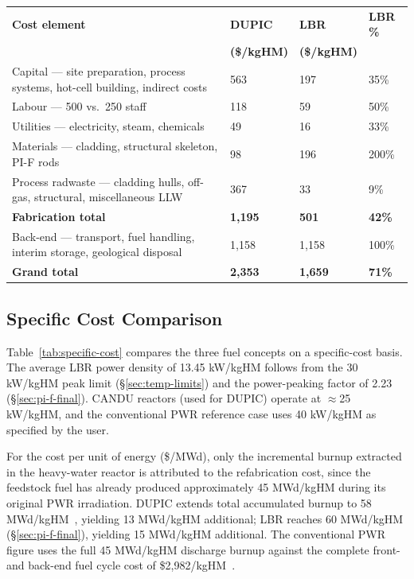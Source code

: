 \renewcommand{\arraystretch}{1.22}
\begin{tabularx}{\linewidth}{L{7.5cm} R{2.2cm} R{2.2cm} R{1.6cm}}
\toprule
\textbf{Cost element}
  & \textbf{DUPIC} & \textbf{LBR}
  & \textbf{LBR \%} \\
  & \textbf{(\$/kgHM)} & \textbf{(\$/kgHM)} & \\
\midrule
Capital --- site preparation, process systems,
  hot-cell building, indirect costs
  & 563 & 197 & 35\% \\
Labour --- 500 vs.\ 250 staff
  & 118 & 59  & 50\% \\
Utilities --- electricity, steam, chemicals
  & 49  & 16  & 33\% \\
Materials --- cladding, structural skeleton, PI-F rods
  & 98  & 196 & 200\% \\
Process radwaste --- cladding hulls, off-gas,
  structural, miscellaneous LLW
  & 367 & 33  & 9\%  \\
\midrule
\textbf{Fabrication total}
  & \textbf{1,195} & \textbf{501} & \textbf{42\%} \\
\midrule
Back-end --- transport, fuel handling, interim
  storage, geological disposal
  & 1,158 & 1,158 & 100\% \\
\midrule
\textbf{Grand total}
  & \textbf{2,353} & \textbf{1,659} & \textbf{71\%} \\
\bottomrule
\end{tabularx}

\subsection{Specific Cost Comparison}

Table~\ref{tab:specific-cost} compares the three fuel concepts on a specific-cost basis. The average LBR power density of 13.45 kW/kgHM follows from the 30 kW/kgHM peak limit (\S\ref{sec:temp-limits}) and the power-peaking factor of 2.23 (\S\ref{sec:pi-f-final}). CANDU reactors (used for DUPIC) operate at $\approx$25 kW/kgHM, and the conventional PWR reference case uses 40 kW/kgHM as specified by the user.

For the cost per unit of energy (\$/MWd), only the incremental burnup extracted in the heavy-water reactor is attributed to the refabrication cost, since the feedstock fuel has already produced approximately 45 MWd/kgHM during its original PWR irradiation. DUPIC extends total accumulated burnup to 58 MWd/kgHM~\cite{Mohamed2016EffectParameters}, yielding 13 MWd/kgHM additional; LBR reaches 60 MWd/kgHM (\S\ref{sec:pi-f-final}), yielding 15 MWd/kgHM additional. The conventional PWR figure uses the full 45 MWd/kgHM discharge burnup against the complete front- and back-end fuel cycle cost of \$2,982/kgHM~\cite{TheCosts}.

